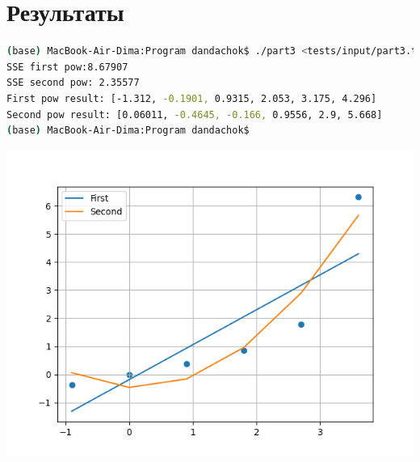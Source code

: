 \section*{Результаты}

\begin{lstlisting}[language=bash]
(base) MacBook-Air-Dima:Program dandachok$ ./part3 <tests/input/part3.t
SSE first pow:8.67907
SSE second pow: 2.35577
First pow result: [-1.312, -0.1901, 0.9315, 2.053, 3.175, 4.296]
Second pow result: [0.06011, -0.4645, -0.166, 0.9556, 2.9, 5.668]
(base) MacBook-Air-Dima:Program dandachok$ 
\end{lstlisting}

\includegraphics[scale=0.8]{src/Results.png}

\pagebreak